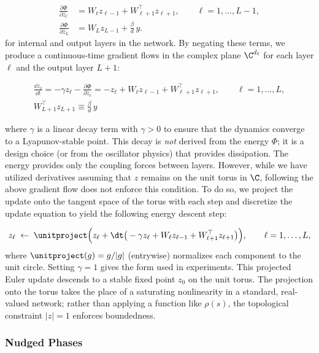 \begin{align}
\frac{\partial \Phi}{\partial \bar{z}_\ell} &= W_\ell z_{\ell-1} + W_{\ell+1}^\top z_{\ell+1}, \qquad \ell = 1,\dots,L-1, \label{eq:grad-hidden}\\
\frac{\partial \Phi}{\partial \bar{z}_L} &= W_L z_{L-1} + \frac{\beta}{d}\, y. \label{eq:grad-output}
\end{align}
for internal and output layers in the network. By negating these terms, we produce a continuous-time gradient flows in the complex plane $\C^{d_\ell}$ for each layer $\ell$ and the output layer $L+1$:

\begin{align}\label{eq:continuous-flow}
\frac{\dd z_\ell}{\dd t} = -\gamma z_\ell - \frac{\partial \Phi}{\partial \bar{z}_\ell}
= -z_\ell + W_\ell z_{\ell-1} + W_{\ell+1}^\top z_{\ell+1},
\qquad \ell = 1,\dots,L,\\
W_{L+1}^\top z_{L+1} \equiv \frac{\beta}{d}\, y
\end{align}

where $\gamma$ is a linear decay term with $\gamma > 0$ to ensure that the dynamics converge to a Lyapunov-stable point. This decay is \emph{not} derived from the energy $\Phi$; it is a design choice (or from the oscillator physics) that provides dissipation. The energy provides only the coupling forces between layers. However, while we have utilized derivatives assuming that $z$ remains on the unit torus in $\C$, following the above gradient flow does not enforce this condition. To do so, we project the update onto the tangent space of the torus with each step and discretize the update equation to yield the following energy descent step:

\begin{equation}\label{eq:discrete-settle}
z_\ell \;\leftarrow\; \unitproject\Big( z_\ell + \dt\big( -\gamma z_\ell + W_\ell z_{\ell-1} + W_{\ell+1}^\top z_{\ell+1} \big) \Big),
\qquad \ell = 1,\dots,L,
\end{equation}
where $\unitproject(g) = g/|g|$ (entrywise) normalizes each component to the unit circle. Setting $\gamma=1$ gives the form used in experiments. This projected Euler update descends to a stable fixed point $z_0$ on the unit torus. The projection onto the torus takes the place of a saturating nonlinearity in a standard, real-valued network; rather than applying a function like $\rho(s)$, the topological constraint $|z|=1$ enforces boundedness.

\subsubsection{Nudged Phases}


